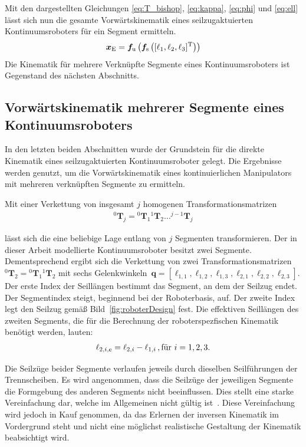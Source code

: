 Mit den dargestellten Gleichungen \eqref{eq:T_bishop}, \eqref{eq:kappa}, \eqref{eq:phi} und \eqref{eq:ell} lässt sich nun die gesamte Vorwärtskinematik eines seilzugaktuierten Kontinuumsroboters für ein Segment ermitteln. 
$$\bm{x}_\mathrm{E} = \bm{f}_\mathrm{u} \left( \bm{f}_\mathrm{s} \left( [\ell_1, \ell_2, \ell_3]^{\mathrm{T}} \right) \right)$$
Die Kinematik für mehrere Verknüpfte Segmente eines Kontinuumsroboters ist Gegenstand des nächsten Abschnitts.

\subsection{Vorwärtskinematik mehrerer Segmente eines Kontinuumsroboters}
\label{subsec:multikinematik}

In den letzten beiden Abschnitten wurde der Grundstein für die direkte Kinematik eines seilzugaktuierten Kontinuumsroboter gelegt. Die Ergebnisse werden genutzt, um die Vorwärtskinematik eines kontinuierlichen Manipulators mit mehreren verknüpften Segmente zu ermitteln. \newline

Mit einer Verkettung von insgesamt $j$ homogenen Transformationsmatrizen
\begin{align}
{}^{0}\bm{T}_j = {}^{0}\bm{T}_{1} {}^1\bm{T}_{2} \dots {}^{j-1}\bm{T}_{j}
\end{align}

lässt sich die eine beliebige Lage entlang von $j$ Segmenten transformieren. Der in dieser Arbeit modellierte Kontinuumsroboter besitzt zwei Segmente. Dementsprechend ergibt sich die Verkettung von zwei Transformationsmatrizen ${}^{0}\bm{T}_2 = {}^{0}\bm{T}_{1} {}^1\bm{T}_{2}$ mit sechs Gelenkwinkeln~$\bm{q} = \left[\ell_{1,1}, \ell_{1,2}, \ell_{1,3}, \ell_{2,1}, \ell_{2,2}, \ell_{2,3} \right]$. 
Der erste Index der Seillängen bestimmt das Segment, an dem der Seilzug endet. Der Segmentindex steigt, beginnend bei der Roboterbasis, auf. Der zweite Index legt den Seilzug gemäß Bild~\ref{fig:roboterDesign} fest. Die effektiven Seillängen des zweiten Segments, die für die Berechnung der roboterspezfischen Kinematik benötigt werden, lauten:
\begin{align}
\ell_{2,i,\mathrm{e}} = \ell_{2,i} - \ell_{1,i}\text{\,}, \text{für~} i = 1,2,3.
\label{eq:effektiveLaenge}
\end{align}

Die Seilzüge beider Segmente verlaufen jeweils durch dieselben Seilführungen der Trennscheiben. Es wird angenommen, dass die Seilzüge der jeweiligen Segmente die Formgebung des anderen Segments nicht beeinflussen. Dies stellt eine starke Vereinfachung dar, welche im Allgemeinen nicht gültig ist~\cite{WIJ10}. Diese Vereinfachung wird jedoch in Kauf genommen, da das Erlernen der inversen Kinematik im Vordergrund steht und nicht eine möglichst realistische Gestaltung der Kinematik beabsichtigt wird.


